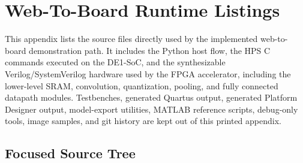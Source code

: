 \usepackage[final]{listings}
\usepackage{booktabs}
\usepackage{float}
\usepackage{tabularx}
\usepackage{xurl}


\newcommand{\codepath}[1]{\begingroup\small\ttfamily\path{#1}\endgroup}

\newcommand{\codedlisting}[3]{%
  \subsubsection{#1}%
  \noindent\textit{\detokenize{#2}}\par\vspace{0.25em}%
}

\clearpage
\appendix

\section{Web-To-Board Runtime Listings}

This appendix lists the source files directly used by the implemented
web-to-board demonstration path. It includes the Python host flow, the HPS C
commands executed on the DE1-SoC, and the synthesizable Verilog/SystemVerilog
hardware used by the FPGA accelerator, including the lower-level SRAM,
convolution, quantization, pooling, and fully connected datapath modules.
Testbenches, generated Quartus output, generated Platform Designer output,
model-export utilities, MATLAB reference scripts, debug-only tools, image
samples, and git history are kept out of this printed appendix.

\subsection{Focused Source Tree}

